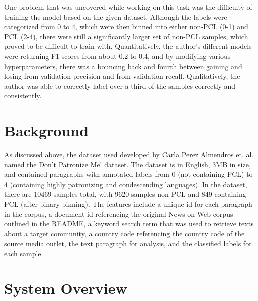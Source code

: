 \documentclass[11pt,a4paper]{article}
\begin{document}
One problem that was uncovered while working on this task was the difficulty of training the model based on the given dataset. Although the labels were categorized from 0 to 4, which were then binned into either non-PCL (0-1) and PCL (2-4), there were still a significantly larger set of non-PCL samples, which proved to be difficult to train with. Quantitatively, the author's different models were returning F1 scores from about 0.2 to 0.4, and by modifying various hyperparameters, there was a bouncing back and fourth between gaining and losing from validation precision and from validation recall. Qualitatively, the author was able to correctly label over a third of the samples correctly and consistently.

\section{Background}
As discussed above, the dataset used developed by Carla Perez Almendros et. al. named the Don't Patronize Me! dataset. The dataset is in English, 3MB in size, and contained paragraphs with annotated labels from 0 (not containing PCL) to 4 (containing highly patronizing and condescending languages). In the dataset, there are 10469 samples total, with 9620 samples non-PCL and 849 containing PCL (after binary binning). The features include a unique id for each paragraph in the corpus, a document id referencing the original News on Web corpus outlined in the README, a keyword search term that was used to retrieve texts about a target community, a country code referencing the country code of the source media outlet, the text paragraph for analysis, and the classified labels for each sample. 





\section{System Overview}
\end{document}
